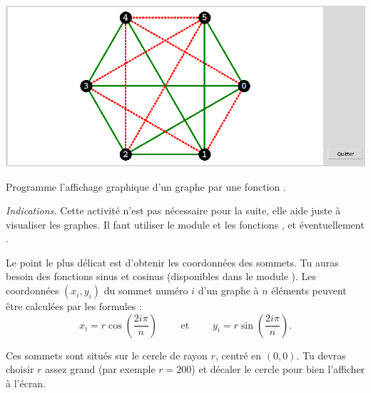 \documentclass[11pt,class=report,crop=false]{standalone}
\begin{document}
\begin{activite}


\begin{center}
\includegraphics[scale=\myscale,scale=0.4]{ecran-ramsey-2}
\end{center}

Programme l'affichage graphique d'un graphe par une fonction .
     
\bigskip
     
\emph{Indications.} Cette activité n'est pas nécessaire pour la suite, elle aide juste à visualiser les graphes. Il faut utiliser le module  et les fonctions ,  et éventuellement . 

Le point le plus délicat est d'obtenir les coordonnées des sommets. Tu auras besoin des fonctions sinus et cosinus (disponibles dans le module ).
Les coordonnées $(x_i,y_i)$ du sommet numéro $i$ d'un graphe à $n$ éléments peuvent être calculées par les formules :
$$x_i = r \cos\left(\frac{2 i \pi}{n}\right) \qquad \text{ et } \qquad y_i = r\sin\left(\frac{2 i \pi}{n}\right).$$

Ces sommets sont situés sur le cercle de rayon $r$, centré en $(0,0)$. 
Tu devras choisir $r$ assez grand (par exemple $r=200$) et décaler le cercle pour bien l'afficher à l'écran.


\end{activite}

\end{document}
